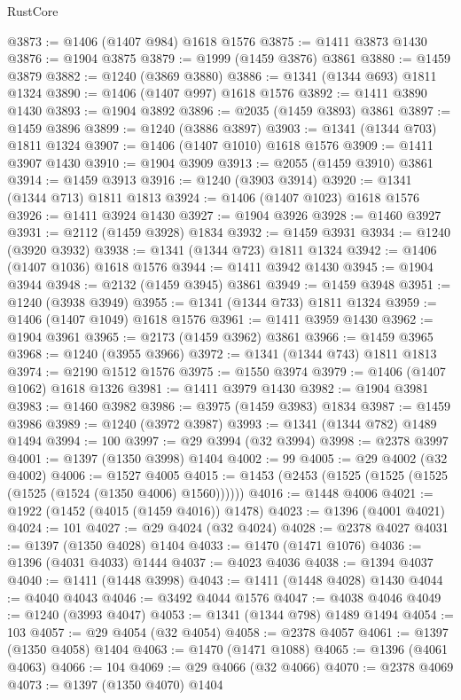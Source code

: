 \begin{lexlean}{RustCore}
\begin{coremodule}
@3873 := @1406 (@1407 @984) @1618 @1576
@3875 := @1411 @3873 @1430
@3876 := @1904 @3875
@3879 := @1999 (@1459 @3876) @3861
@3880 := @1459 @3879
@3882 := @1240 (@3869 @3880)
@3886 := @1341 (@1344 @693) @1811 @1324
@3890 := @1406 (@1407 @997) @1618 @1576
@3892 := @1411 @3890 @1430
@3893 := @1904 @3892
@3896 := @2035 (@1459 @3893) @3861
@3897 := @1459 @3896
@3899 := @1240 (@3886 @3897)
@3903 := @1341 (@1344 @703) @1811 @1324
@3907 := @1406 (@1407 @1010) @1618 @1576
@3909 := @1411 @3907 @1430
@3910 := @1904 @3909
@3913 := @2055 (@1459 @3910) @3861
@3914 := @1459 @3913
@3916 := @1240 (@3903 @3914)
@3920 := @1341 (@1344 @713) @1811 @1813
@3924 := @1406 (@1407 @1023) @1618 @1576
@3926 := @1411 @3924 @1430
@3927 := @1904 @3926
@3928 := @1460 @3927
@3931 := @2112 (@1459 @3928) @1834
@3932 := @1459 @3931
@3934 := @1240 (@3920 @3932)
@3938 := @1341 (@1344 @723) @1811 @1324
@3942 := @1406 (@1407 @1036) @1618 @1576
@3944 := @1411 @3942 @1430
@3945 := @1904 @3944
@3948 := @2132 (@1459 @3945) @3861
@3949 := @1459 @3948
@3951 := @1240 (@3938 @3949)
@3955 := @1341 (@1344 @733) @1811 @1324
@3959 := @1406 (@1407 @1049) @1618 @1576
@3961 := @1411 @3959 @1430
@3962 := @1904 @3961
@3965 := @2173 (@1459 @3962) @3861
@3966 := @1459 @3965
@3968 := @1240 (@3955 @3966)
@3972 := @1341 (@1344 @743) @1811 @1813
@3974 := @2190 @1512 @1576
@3975 := @1550 @3974
@3979 := @1406 (@1407 @1062) @1618 @1326
@3981 := @1411 @3979 @1430
@3982 := @1904 @3981
@3983 := @1460 @3982
@3986 := @3975 (@1459 @3983) @1834
@3987 := @1459 @3986
@3989 := @1240 (@3972 @3987)
@3993 := @1341 (@1344 @782) @1489 @1494
@3994 := 100
@3997 := @29 @3994 (@32 @3994)
@3998 := @2378 @3997
@4001 := @1397 (@1350 @3998) @1404
@4002 := 99
@4005 := @29 @4002 (@32 @4002)
@4006 := @1527 @4005
@4015 := @1453 (@2453 (@1525 (@1525 (@1525 (@1525 (@1524 (@1350 @4006) @1560))))))
@4016 := @1448 @4006
@4021 := @1922 (@1452 (@4015 (@1459 @4016)) @1478)
@4023 := @1396 (@4001 @4021)
@4024 := 101
@4027 := @29 @4024 (@32 @4024)
@4028 := @2378 @4027
@4031 := @1397 (@1350 @4028) @1404
@4033 := @1470 (@1471 @1076)
@4036 := @1396 (@4031 @4033) @1444
@4037 := @4023 @4036
@4038 := @1394 @4037
@4040 := @1411 (@1448 @3998)
@4043 := @1411 (@1448 @4028) @1430
@4044 := @4040 @4043
@4046 := @3492 @4044 @1576
@4047 := @4038 @4046
@4049 := @1240 (@3993 @4047)
@4053 := @1341 (@1344 @798) @1489 @1494
@4054 := 103
@4057 := @29 @4054 (@32 @4054)
@4058 := @2378 @4057
@4061 := @1397 (@1350 @4058) @1404
@4063 := @1470 (@1471 @1088)
@4065 := @1396 (@4061 @4063)
@4066 := 104
@4069 := @29 @4066 (@32 @4066)
@4070 := @2378 @4069
@4073 := @1397 (@1350 @4070) @1404

\end{coremodule}
\end{lexlean}
